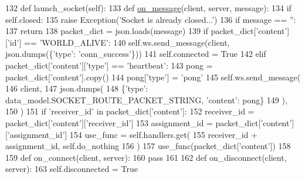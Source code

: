 \begin{DoxyCode}
132     \textcolor{keyword}{def }launch\_socket(self):
133         \textcolor{keyword}{def }\hyperlink{namespaceparlai_1_1chat__service_1_1services_1_1terminal__chat_1_1client_a0ef2bb2bd3b966dcdd8402a92b999708}{on\_message}(client, server, message):
134             \textcolor{keywordflow}{if} self.closed:
135                 \textcolor{keywordflow}{raise} Exception(\textcolor{stringliteral}{'Socket is already closed...'})
136             \textcolor{keywordflow}{if} message == \textcolor{stringliteral}{''}:
137                 \textcolor{keywordflow}{return}
138             packet\_dict = json.loads(message)
139             \textcolor{keywordflow}{if} packet\_dict[\textcolor{stringliteral}{'content'}][\textcolor{stringliteral}{'id'}] == \textcolor{stringliteral}{'WORLD\_ALIVE'}:
140                 self.ws.send\_message(client, json.dumps(\{\textcolor{stringliteral}{'type'}: \textcolor{stringliteral}{'conn\_success'}\}))
141                 self.connected = \textcolor{keyword}{True}
142             \textcolor{keywordflow}{elif} packet\_dict[\textcolor{stringliteral}{'content'}][\textcolor{stringliteral}{'type'}] == \textcolor{stringliteral}{'heartbeat'}:
143                 pong = packet\_dict[\textcolor{stringliteral}{'content'}].copy()
144                 pong[\textcolor{stringliteral}{'type'}] = \textcolor{stringliteral}{'pong'}
145                 self.ws.send\_message(
146                     client,
147                     json.dumps(
148                         \{\textcolor{stringliteral}{'type'}: data\_model.SOCKET\_ROUTE\_PACKET\_STRING, \textcolor{stringliteral}{'content'}: pong\}
149                     ),
150                 )
151             \textcolor{keywordflow}{if} \textcolor{stringliteral}{'receiver\_id'} \textcolor{keywordflow}{in} packet\_dict[\textcolor{stringliteral}{'content'}]:
152                 receiver\_id = packet\_dict[\textcolor{stringliteral}{'content'}][\textcolor{stringliteral}{'receiver\_id'}]
153                 assignment\_id = packet\_dict[\textcolor{stringliteral}{'content'}][\textcolor{stringliteral}{'assignment\_id'}]
154                 use\_func = self.handlers.get(
155                     receiver\_id + assignment\_id, self.do\_nothing
156                 )
157                 use\_func(packet\_dict[\textcolor{stringliteral}{'content'}])
158 
159         \textcolor{keyword}{def }on\_connect(client, server):
160             \textcolor{keywordflow}{pass}
161 
162         \textcolor{keyword}{def }on\_disconnect(client, server):
163             self.disconnected = \textcolor{keyword}{True}

\end{DoxyCode}

